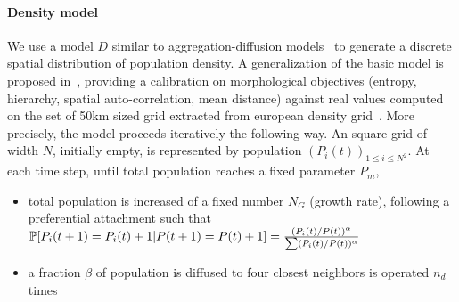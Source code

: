 

\paragraph{Density model}

We use a model $D$ similar to aggregation-diffusion models~\cite{batty2006hierarchy} to generate a discrete spatial distribution of population density. A generalization of the basic model is proposed in~\cite{raimbault2016calibration}, providing a calibration on morphological objectives (entropy, hierarchy, spatial auto-correlation, mean distance) against real values computed on the set of 50km sized grid extracted from european density grid~\cite{eurostat}. More precisely, the model proceeds iteratively the following way. An square grid of width $N$, initially empty, is represented by population $(P_i(t))_{1\leq i\leq N^2}$. At each time step, until total population reaches a fixed parameter $P_m$,
\begin{itemize}
\item total population is increased of a fixed number $N_G$ (growth rate), following a preferential attachment such that $\operatorname{\mathbb{P}}\!\left[P_i(t+1)=P_i(t)+1|P(t+1)=P(t)+1\right]=\frac{(P_i(t)/P(t))^{\alpha}}{\sum(P_i(t)/P(t))^{\alpha}}$
\item a fraction $\beta$ of population is diffused to four closest neighbors is operated $n_d$ times
\end{itemize}




